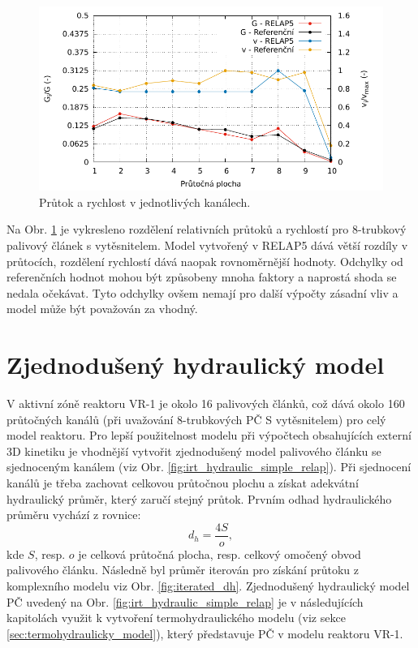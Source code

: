 \begin{figure}[H]
	\centering
	\includegraphics[width=\textwidth]{./04_TH_model_IRT/grafy/rozdeleni_v_g.pdf}
	\caption{Průtok a rychlost v jednotlivých kanálech.}
	\label{fig:rozdeleni_v_g}
\end{figure}
Na Obr. \ref{fig:rozdeleni_v_g} je vykresleno rozdělení relativních průtoků a rychlostí pro 8-trubkový palivový článek s vytěsnitelem. Model vytvořený v RELAP5 dává větší rozdíly v průtocích, rozdělení rychlostí dává naopak rovnoměrnější hodnoty. Odchylky od referenčních hodnot mohou být způsobeny mnoha faktory a naprostá shoda se nedala očekávat. Tyto odchylky ovšem nemají pro další výpočty zásadní vliv a model může být považován za vhodný.

\section{Zjednodušený hydraulický model}
\label{sec:zjednoduseny_hydraulicky_model_irt}
V aktivní zóně reaktoru VR-1 je okolo 16 palivových článků, což dává okolo 160 průtočných kanálů (při uvažování 8-trubkových PČ S vytěsnitelem) pro celý model reaktoru. Pro lepší použitelnost modelu při výpočtech obsahujících externí 3D kinetiku je vhodnější vytvořit zjednodušený model palivového článku se sjednoceným kanálem (viz Obr. \ref{fig:irt_hydraulic_simple_relap}). Při sjednocení kanálů je třeba zachovat celkovou průtočnou plochu a získat adekvátní hydraulický průměr, který zaručí stejný průtok. Prvním odhad hydraulického průměru vychází z rovnice:
\begin{equation}
	d_h = \frac{4S}{o},
	\label{eq:dh}
\end{equation}
kde $S$, resp. $o$ je celková průtočná plocha, resp. celkový omočený obvod palivového článku. Následně byl průměr iterován pro získání průtoku z komplexního modelu viz Obr. \ref{fig:iterated_dh}. Zjednodušený hydraulický model PČ uvedený na Obr. \ref{fig:irt_hydraulic_simple_relap} je v následujících kapitolách využit k vytvoření termohydraulického  modelu (viz sekce \ref{sec:termohydraulicky_model}), který představuje PČ v modelu reaktoru VR-1.

